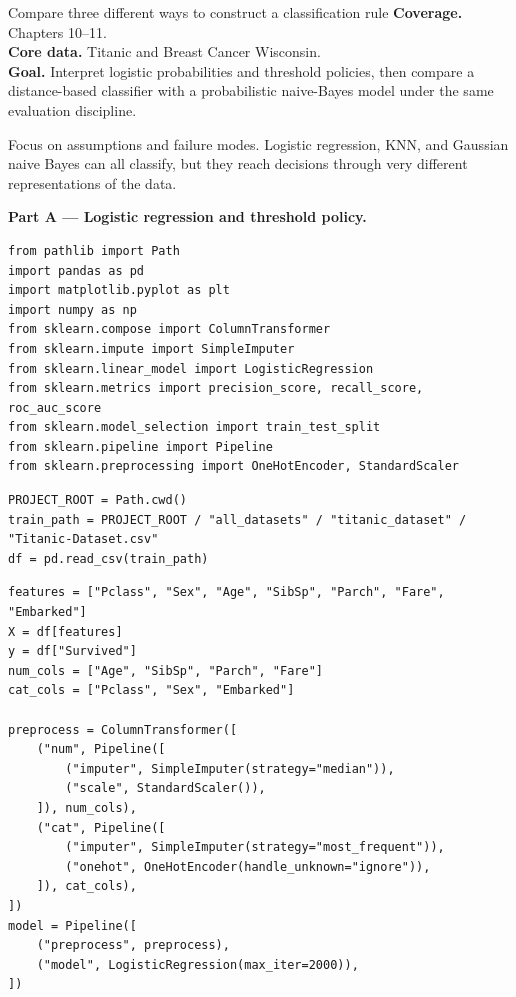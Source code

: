 
\begin{labproject}{Compare three different ways to construct a classification rule}
\textbf{Coverage.} Chapters 10--11.\\
\textbf{Core data.} Titanic and Breast Cancer Wisconsin.\\
\textbf{Goal.} Interpret logistic probabilities and threshold policies, then compare a distance-based classifier with a probabilistic naive-Bayes model under the same evaluation discipline.

\begin{labmode}
Focus on assumptions and failure modes. Logistic regression, KNN, and Gaussian naive Bayes can all classify, but they reach decisions through very different representations of the data.
\end{labmode}

\medskip\noindent\textbf{Part A --- Logistic regression and threshold policy.}\par
\begin{lstlisting}[style=mlpython]
from pathlib import Path
import pandas as pd
import matplotlib.pyplot as plt
import numpy as np
from sklearn.compose import ColumnTransformer
from sklearn.impute import SimpleImputer
from sklearn.linear_model import LogisticRegression
from sklearn.metrics import precision_score, recall_score, roc_auc_score
from sklearn.model_selection import train_test_split
from sklearn.pipeline import Pipeline
from sklearn.preprocessing import OneHotEncoder, StandardScaler
\end{lstlisting}

\begin{lstlisting}[style=mlpython]
PROJECT_ROOT = Path.cwd()
train_path = PROJECT_ROOT / "all_datasets" / "titanic_dataset" / "Titanic-Dataset.csv"
df = pd.read_csv(train_path)
\end{lstlisting}

\begin{lstlisting}[style=mlpython]
features = ["Pclass", "Sex", "Age", "SibSp", "Parch", "Fare", "Embarked"]
X = df[features]
y = df["Survived"]
num_cols = ["Age", "SibSp", "Parch", "Fare"]
cat_cols = ["Pclass", "Sex", "Embarked"]

preprocess = ColumnTransformer([
    ("num", Pipeline([
        ("imputer", SimpleImputer(strategy="median")),
        ("scale", StandardScaler()),
    ]), num_cols),
    ("cat", Pipeline([
        ("imputer", SimpleImputer(strategy="most_frequent")),
        ("onehot", OneHotEncoder(handle_unknown="ignore")),
    ]), cat_cols),
])
model = Pipeline([
    ("preprocess", preprocess),
    ("model", LogisticRegression(max_iter=2000)),
])


\end{lstlisting}
\end{labproject}
